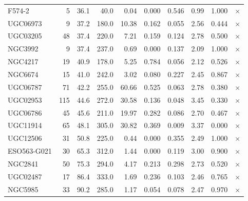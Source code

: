 \begin{longtable}{lrrrrrrrrr}
F574-2 & 5 & 36.1 & 40.0 & 0.04 & 0.000 & 0.546 & 0.99 & 1.000 & $\times$ \\
UGC06973 & 9 & 37.2 & 180.0 & 10.38 & 0.162 & 0.055 & 2.56 & 0.444 & $\times$ \\
UGC03205 & 48 & 37.4 & 220.0 & 7.21 & 0.159 & 0.124 & 2.78 & 0.500 & $\times$ \\
NGC3992 & 9 & 37.4 & 237.0 & 0.69 & 0.000 & 0.137 & 2.09 & 1.000 & $\times$ \\
NGC4217 & 19 & 40.9 & 178.0 & 5.25 & 0.784 & 0.056 & 2.12 & 0.526 & $\times$ \\
NGC6674 & 15 & 41.0 & 242.0 & 3.02 & 0.080 & 0.227 & 2.45 & 0.867 & $\times$ \\
UGC06787 & 71 & 42.2 & 255.0 & 60.66 & 0.525 & 0.063 & 2.78 & 0.380 & $\times$ \\
UGC02953 & 115 & 44.6 & 272.0 & 30.58 & 0.136 & 0.048 & 3.45 & 0.330 & $\times$ \\
UGC06786 & 45 & 45.6 & 211.0 & 19.97 & 0.282 & 0.086 & 2.70 & 0.467 & $\times$ \\
UGC11914 & 65 & 48.1 & 305.0 & 30.82 & 0.369 & 0.009 & 3.37 & 0.000 & $\times$ \\
UGC12506 & 31 & 50.8 & 225.0 & 0.44 & 0.000 & 0.355 & 2.49 & 1.000 & $\times$ \\
ESO563-G021 & 30 & 65.3 & 312.0 & 1.44 & 0.000 & 0.119 & 3.00 & 0.900 & $\times$ \\
NGC2841 & 50 & 75.3 & 294.0 & 4.17 & 0.213 & 0.298 & 2.73 & 0.520 & $\times$ \\
UGC02487 & 17 & 86.4 & 333.0 & 1.69 & 0.236 & 0.103 & 2.46 & 0.765 & $\times$ \\
NGC5985 & 33 & 90.2 & 285.0 & 1.17 & 0.054 & 0.078 & 2.47 & 0.970 & $\times$ \\
\end{longtable}
